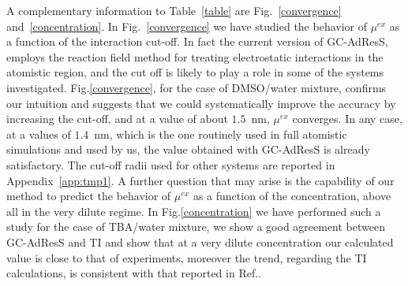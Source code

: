 \documentclass[a4paper,preprint,unsortedaddress]{revtex4-1}
\begin{document}
{A complementary information to Table~\ref{table} are 
  Fig.~\ref{convergence} and~\ref{concentration}.
  In Fig.~\ref{convergence} we have studied the behavior of $\mu^{ex}$ as a function of
  the interaction cut-off. In fact the current version of GC-AdResS,
  employs the reaction field method for treating electrostatic
  interactions in the atomistic region, and the cut off is likely to
  play a role in some of the systems investigated. Fig.\ref{convergence}, for the case of DMSO/water
  mixture, confirms our intuition and suggests that we could
  systematically improve the accuracy by increasing the cut-off,
  and at a value of about $1.5$~nm, $\mu^{ex}$ converges. In any
  case, at a values of $1.4$~nm, which is the one routinely used in
  full atomistic simulations and used by us, the
  value obtained with GC-AdResS is already satisfactory.
  The cut-off radii used for other systems are reported in Appendix~\ref{app:tmp1}.
  A further
  question that may arise is the capability of our method to predict
  the behavior of $\mu^{ex}$ as a function of the concentration, above
  all in the very dilute regime. In Fig.\ref{concentration} we have
  performed such a study for the case of TBA/water mixture, we show a
  good agreement between GC-AdResS and TI and show that at a very
  dilute concentration our calculated value is close to that of
  experiments, moreover the trend, regarding the TI calculations, is
  consistent with that reported in Ref.\cite{nico}.\\
}
\end{document}
